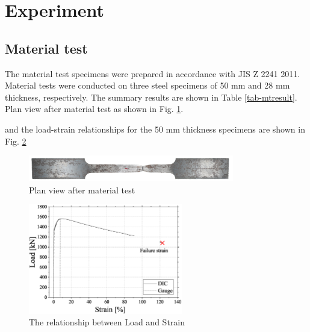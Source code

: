 \section{Experiment}

\subsection{Material test}

The material test specimens were prepared in accordance with JIS Z 2241 2011\cite{JIStest}. Material tests were conducted on three steel specimens of 50 mm and 28 mm thickness, respectively. The summary results are shown in Table \ref{tab-mtresult}. Plan view after material test as shown in Fig. \ref{fig-mt-1}. \par

and the load-strain relationships for the 50 mm thickness specimens are shown in Fig. \ref{fig-mt50-ls}

\begin{figure}[htbp]
    \centering
    \includegraphics[width=0.8\textwidth]{imgs/ch6/mt-1.jpg}
    \caption{Plan view after material test}
    \label{fig-mt-1}
\end{figure}

\begin{figure}[htbp]
    \centering
    \includegraphics[width=0.6\textwidth]{imgs/ch6/mt50-LS.eps}
    \caption{The relationship between Load and Strain}
    \label{fig-mt50-ls}
\end{figure}

